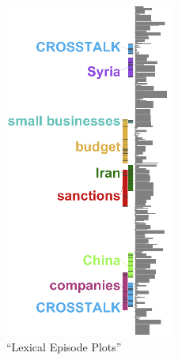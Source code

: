 \documentclass{l4proj}
\begin{document}
\begin{figure}
    \includegraphics[width=\linewidth]{images/document_visualization/topic-overview.png}
    \caption{``Lexical Episode Plots''\\ \protect\autocite{goldExploratoryTextAnalysis2015}}
    \label{fig:lexical_plot}
\end{figure}
\end{document}
